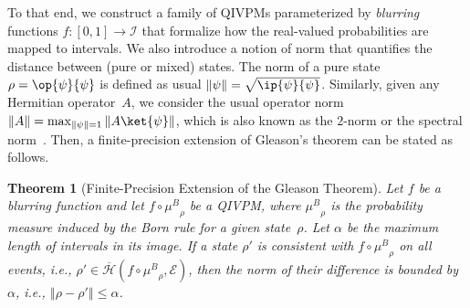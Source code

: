 \documentclass[english,reprint, aps, prl,superscriptaddress, showpacs,
showkeys, longbibliography, amsmath, amssymb, floatfix]{revtex4-1}
\theoremstyle{plain}
\newtheorem{thm}{Theorem}
\theoremstyle{definition}
\newcommand{\Hilb}{\mathcal{H}}
\newcommand{\events}{\ensuremath{\mathcal{E}}}
\newcommand{\proj}[1]{\op{#1}{#1}}
\newcommand{\coreBorn}{\ensuremath{\overline{\Hilb}}}
\newcommand{\ultramodular}{\mathcal{M}}
\newcommand{\muB}{\ensuremath{\mu^{B}}}
\begin{document}
To that end, we construct a family of QIVPMs parameterized by
\emph{blurring} functions $f:\left[0,1\right]\rightarrow\mathscr{I}$ that
formalize how the real-valued probabilities are mapped to
intervals. We also introduce a notion of norm that quantifies the
distance between (pure or mixed) states.  The norm of a pure
state $\rho=\proj{\psi}$ is defined as usual
$\left\Vert \psi\right\Vert =\sqrt{\ip{\psi}{\psi}}$.  Similarly,
given any Hermitian operator~$A$, we consider the usual operator norm
$\left\Vert A\right\Vert =\max_{\left\Vert \psi\right\Vert
  =1}\left\Vert A\ket{\psi}\right\Vert $, which is also known as the
$2$-norm or the spectral
norm~\citep{RobertsVarberg1973,peres1995quantum,GolubVanLoan1996,Foucart2012}.
Then, a finite-precision extension of Gleason's theorem can be stated as
follows.



\begin{thm}[Finite-Precision Extension of the Gleason
  Theorem]\label{thm:Finite-precision-Gleason}Let $f$ be a blurring
  function and let $f \circ \muB_{\rho}$ be a QIVPM, where
  $\muB_{\rho}$ is the probability measure induced by the
  Born rule for a given state~$\rho$. Let $\alpha$ be the maximum
  length of intervals in its image. If a state $\rho'$ is consistent
  with $f\circ\muB_{\rho}$ on all events, i.e.,
  $\rho'\in\coreBorn\left(f\circ\muB_{\rho},\events\right)$,
  then the norm of their difference is bounded by $\alpha$, i.e.,
  $\left\Vert \rho-\rho'\right\Vert \le \alpha$.\end{thm}
\end{document}
